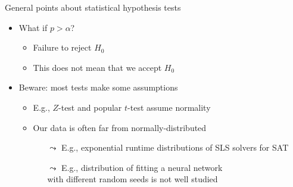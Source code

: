 \begin{frame}[c]{General points about statistical hypothesis tests}

\begin{itemize}
\item What if $p > \alpha$?
\begin{itemize}
\item \alert{Failure to reject $H_0$}
\item \alert{This does not mean that we accept $H_0$}
\end{itemize}


\pause
\bigskip
\item Beware: most tests make some assumptions
\begin{itemize}
\item E.g., $Z$-test and popular $t$-test assume \alert{normality}
\item Our data is often far from normally-distributed
\begin{itemize}
\item[$\leadsto$] E.g., exponential runtime distributions of SLS solvers for SAT
\item[$\leadsto$] E.g., distribution of fitting a neural network\\ with different random seeds is not well studied
\end{itemize}
\end{itemize}

\end{itemize}

\end{frame}
